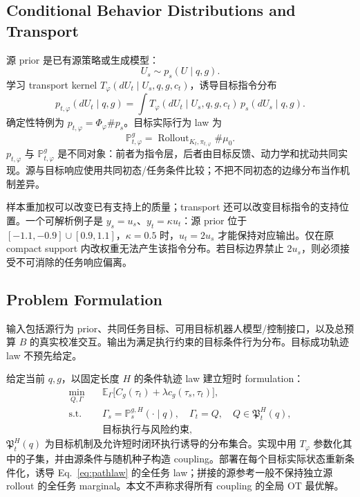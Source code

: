 \documentclass[11pt]{article}
\newcommand{\E}{\mathbb E}
\begin{document}
\subsection{Conditional Behavior Distributions and Transport}
源 prior 是已有源策略或生成模型：
\begin{equation}
 U_s\sim p_s(U\mid q,g).
\end{equation}
学习 transport kernel $T_\varphi(dU_t\mid U_s,q,g,c_t)$，诱导目标指令分布
\begin{equation}
 p_{t,\varphi}(dU_t\mid q,g)
 =\int T_\varphi(dU_t\mid U_s,q,g,c_t)\,p_s(dU_s\mid q,g).
 \label{eq:kerneltransport}
\end{equation}
确定性特例为 $p_{t,\varphi}=\Phi_\varphi\#p_s$。目标实际行为 law 为
\begin{equation}
 \mathbb P_{t,\varphi}^{g}
 =\operatorname{Rollout}_{K_t,\pi_{t,\varphi}}\#\mu_0.
 \label{eq:pathlaw}
\end{equation}
$p_{t,\varphi}$ 与 $\mathbb P_{t,\varphi}^{g}$ 是不同对象：前者为指令层，后者由目标反馈、动力学和扰动共同实现。源与目标响应使用共同初态/任务条件比较；不把不同初态的边缘分布当作机制差异。

样本重加权可以改变已有支持上的质量；transport 还可以改变目标指令的支持位置。一个可解析例子是 $y_s=u_s$、$y_t=\kappa u_t$：源 prior 位于 $[-1.1,-0.9]\cup[0.9,1.1]$，$\kappa=0.5$ 时，$u_t=2u_s$ 才能保持对应输出。仅在原 compact support 内改权重无法产生该指令分布。若目标边界禁止 $2u_s$，则必须接受不可消除的任务响应偏离。

\subsection{Problem Formulation}
输入包括源行为 prior、共同任务目标、可用目标机器人模型/控制接口，以及总预算 $B$ 的真实校准交互。输出为满足执行约束的目标条件行为分布。目标成功轨迹 law 不预先给定。

给定当前 $q,g$，以固定长度 $H$ 的条件轨迹 law 建立短时 formulation：
\begin{equation}
 \begin{aligned}
 \min_{Q,\Gamma}\quad&
 \E_{\Gamma}\big[C_g(\tau_t)+\lambda c_g(\tau_s,\tau_t)\big],\\
 \text{s.t.}\quad&\Gamma_s=\mathbb P_s^{g,H}(\cdot\mid q),\quad \Gamma_t=Q,
 \quad Q\in\mathfrak P_t^H(q),\\
 &\text{目标执行与风险约束},
 \end{aligned}
 \label{eq:ideal}
\end{equation}
$\mathfrak P_t^H(q)$ 为目标机制及允许短时闭环执行诱导的分布集合。实现中用 $T_\varphi$ 参数化其中的子集，并由源条件与随机种子构造 coupling。部署在每个目标实际状态重新条件化，诱导 Eq.~\eqref{eq:pathlaw} 的全任务 law；拼接的源参考一般不保持独立源 rollout 的全任务 marginal。本文不声称求得所有 coupling 的全局 OT 最优解。
\end{document}
